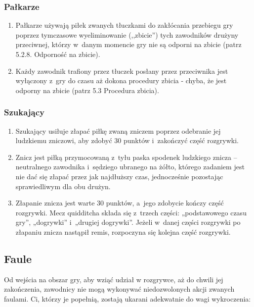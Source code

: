 \documentclass[12pt,a4paper]{article}
\begin{document}
\subsubsection{Pałkarze}
\begin{enumerate}
	\item Pałkarze używają piłek zwanych tłuczkami do zakłócania przebiegu gry
	      poprzez tymczasowe wyeliminowanie (,,zbicie'') tych zawodników drużyny
	      przeciwnej, którzy w~danym momencie gry nie są odporni na zbicie (patrz
	      5.2.8. Odporność na zbicie).

	\item Każdy zawodnik trafiony przez tłuczek posłany przez przeciwnika jest
	      wyłączony z~gry do czasu aż dokona procedury zbicia - chyba, że jest
	      odporny na zbicie (patrz 5.3 Procedura zbicia).
\end{enumerate}

\subsubsection{Szukający}
\begin{enumerate}
	\item Szukający usiłuje złapać piłkę zwaną zniczem poprzez odebranie jej
	      ludzkiemu zniczowi, aby zdobyć 30 punktów i~zakończyć część rozgrywki.

	\item Znicz jest piłką przymocowaną z~tyłu paska spodenek ludzkiego znicza
	      -- neutralnego zawodnika i~sędziego ubranego na żółto,
	      którego zadaniem jest nie dać się złapać przez jak najdłuższy czas,
	      jednocześnie pozostając sprawiedliwym dla obu drużyn.

	\item Złapanie znicza jest warte 30 punktów, a~jego zdobycie kończy część
	      rozgrywki. Mecz quidditcha składa się z~trzech części: „podstawowego
	      czasu gry'', „dogrywki'' i~„drugiej dogrywki''. Jeżeli w~danej części
	      rozgrywki po złapaniu znicza nastąpił remis, rozpoczyna się kolejna
	      część rozgrywki.
\end{enumerate}

\subsection{Faule}
Od wejścia na obszar gry, aby wziąć udział w rozgrywce, aż do chwili jej zakończenia, zawodnicy nie mogą wykonywać niedozwolonych akcji zwanych faulami. Ci, którzy je popełnią, zostają ukarani adekwatnie do wagi wykroczenia: 
\end{document}
